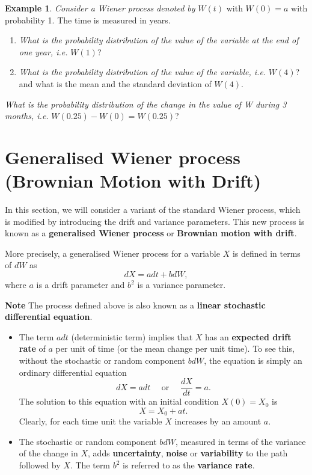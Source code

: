\documentclass[
]{book}
\theoremstyle{definition}
\theoremstyle{definition}
\newtheorem{example}{Example}[chapter]
\theoremstyle{definition}
\theoremstyle{definition}
\theoremstyle{remark}
\begin{document}
\begin{example}
\emph{Consider a Wiener process denoted by} \(W(t)\) with \(W(0) = a\) with
probability 1. The time is measured in years.

\begin{enumerate}
\def\labelenumi{\arabic{enumi}.}
\item
  \emph{What is the probability distribution of the value of the variable
  at the end of one year, i.e.} \(W(1)\)?
\item
  \emph{What is the probability distribution of the value of the variable,
  i.e.} \(W(4)\)? and what is the mean and the standard deviation of
  \(W(4)\).
\end{enumerate}

\emph{What is the probability distribution of the change in the value of W
during 3 months, i.e.} \(W(0.25) - W(0) = W(0.25)\)?
\end{example}

\hypertarget{generalised-wiener-process-brownian-motion-with-drift}{%
\section{Generalised Wiener process (Brownian Motion with Drift)}\label{generalised-wiener-process-brownian-motion-with-drift}}

In this section, we will consider a variant of the standard Wiener
process, which is modified by introducing the drift and variance
parameters. This new process is known as a \textbf{generalised Wiener
process} or \textbf{Brownian motion with drift}.

More precisely, a generalised Wiener process for a variable \(X\) is
defined in terms of \(dW\) as \[dX = a dt + b dW,\] where \(a\) is a drift
parameter and \(b^2\) is a variance parameter.

\textbf{Note} The process defined above is also known as a \textbf{linear
stochastic differential equation}.

\begin{itemize}
\item
  The term \(a dt\) (deterministic term) implies that \(X\) has an
  \textbf{expected drift rate} of \(a\) per unit of time (or the mean change
  per unit time). To see this, without the stochastic or random
  component \(b dW\), the equation is simply an ordinary differential
  equation \[dX = a dt \quad \text{ or } \quad \frac{dX}{dt} = a.\]
  The solution to this equation with an initial condition \(X(0) = X_0\)
  is \[X = X_0 + a t.\] Clearly, for each time unit the variable \(X\)
  increases by an amount \(a\).
\item
  The stochastic or random component \(b dW\), measured in terms of the
  variance of the change in \(X\), adds \textbf{uncertainty}, \textbf{noise} or
  \textbf{variability} to the path followed by \(X\). The term \(b^2\) is
  referred to as the \textbf{variance rate}.
\end{itemize}
\end{document}
